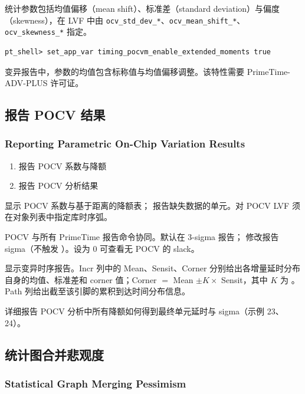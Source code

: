 统计参数包括均值偏移（mean shift）、标准差（standard deviation）与偏度（skewness），在 LVF 中由 \texttt{ocv\_std\_dev\_*}、\texttt{ocv\_mean\_shift\_*}、\texttt{ocv\_skewness\_*} 指定。

\begin{lstlisting}
pt_shell> set_app_var timing_pocvm_enable_extended_moments true
\end{lstlisting}

变异报告中，参数的均值包含标称值与均值偏移调整。该特性需要 PrimeTime-ADV-PLUS 许可证。

\subsection{报告 POCV 结果}
\subsubsection*{Reporting Parametric On-Chip Variation Results}

\begin{enumerate}
  \item 报告 POCV 系数与降额
  \item 报告 POCV 分析结果
\end{enumerate}

 显示 POCV 系数与基于距离的降额表； 报告缺失数据的单元。对 POCV LVF 须在对象列表中指定库时序弧。

POCV 与所有 PrimeTime 报告命令协同。默认在 3-sigma 报告； 修改报告 sigma（不触发 ）。设为 0 可查看无 POCV 的 slack。

 显示变异时序报告。Incr 列中的 Mean、Sensit、Corner 分别给出各增量延时分布自身的均值、标准差和 corner 值；Corner $=$ Mean $\pm K \times$ Sensit，其中 $K$ 为 。Path 列给出截至该引脚的累积到达时间分布信息。

 详细报告 POCV 分析中所有降额如何得到最终单元延时与 sigma（示例 23、24）。

\subsection{统计图合并悲观度}
\subsubsection*{Statistical Graph Merging Pessimism}

